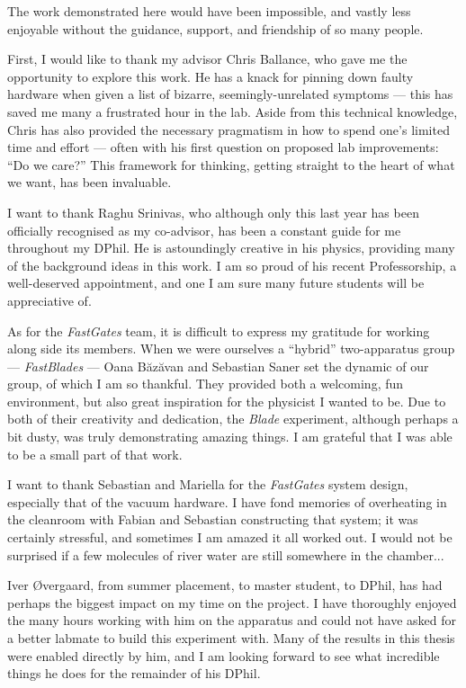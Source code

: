 The work demonstrated here would have been impossible, and vastly less enjoyable without the guidance, support, and friendship of so many people.

First, I would like to thank my advisor Chris Ballance, who gave me the opportunity to explore this work. He has a knack for pinning down faulty hardware when given a list of bizarre, seemingly-unrelated symptoms --- this has saved me many a frustrated hour in the lab. Aside from this technical knowledge, Chris has also provided the necessary pragmatism in how to spend one's limited time and effort --- often with his first question on proposed lab improvements: ``Do we care?'' This framework for thinking, getting straight to the heart of what we want, has been invaluable. 

I want to thank Raghu Srinivas, who although only this last year has been officially recognised as my co-advisor, has been a constant guide for me throughout my DPhil. He is astoundingly creative in his physics, providing many of the background ideas in this work. I am so proud of his recent Professorship, a well-deserved appointment, and one I am sure many future students will be appreciative of.

As for the \emph{FastGates} team, it is difficult to express my gratitude for working along side its members. When we were ourselves a ``hybrid'' two-apparatus group --- \emph{FastBlades} --- Oana Băzăvan and Sebastian Saner set the dynamic of our group, of which I am so thankful. They provided both a welcoming, fun environment, but also great inspiration for the physicist I wanted to be. Due to both of their creativity and dedication, the \emph{Blade} experiment, although perhaps a bit dusty, was truly demonstrating amazing things. I am grateful that I was able to be a small part of that work. 

I want to thank Sebastian and Mariella for the \emph{FastGates} system design, especially that of the vacuum hardware. I have fond memories of overheating in the cleanroom with Fabian and Sebastian constructing that system; it was certainly stressful, and sometimes I am amazed it all worked out. I would not be surprised if a few molecules of river water are still somewhere in the chamber...

Iver {\O}vergaard, from summer placement, to master student, to DPhil, has had perhaps the biggest impact on my time on the project. I have thoroughly enjoyed the many hours working with him on the apparatus and could not have asked for a better labmate to build this experiment with. 
Many of the results in this thesis were enabled directly by him, and I am looking forward to see what incredible things he does for the remainder of his DPhil.

